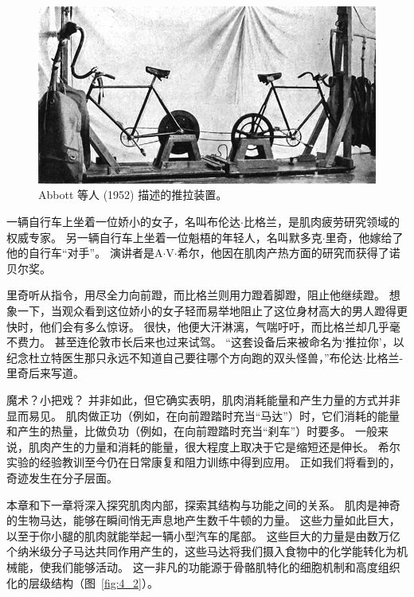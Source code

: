 \begin{figure}[!htb]
	\centering
	\includegraphics[width=1.0\linewidth]{chap4/4_1}
	\caption{Abbott 等人 (1952) 描述的推拉装置。 \label{fig:4_1}}
\end{figure}


一辆自行车上坐着一位娇小的女子，名叫布伦达$\cdot$比格兰，是肌肉疲劳研究领域的权威专家。
另一辆自行车上坐着一位魁梧的年轻人，名叫默多克$\cdot$里奇，他嫁给了他的自行车“对手”。
演讲者是A$\cdot$V$\cdot$希尔，他因在肌肉产热方面的研究而获得了诺贝尔奖。


里奇听从指令，用尽全力向前蹬，而比格兰则用力蹬着脚蹬，阻止他继续蹬。
想象一下，当观众看到这位娇小的女子轻而易举地阻止了这位身材高大的男人蹬得更快时，他们会有多么惊讶。
很快，他便大汗淋漓，气喘吁吁，而比格兰却几乎毫不费力。
甚至连伦敦市长后来也过来试驾。
“这套设备后来被命名为‘推拉你’，以纪念杜立特医生那只永远不知道自己要往哪个方向跑的双头怪兽，”布伦达$\cdot$比格兰-里奇后来写道。


魔术？小把戏？
并非如此，但它确实表明，肌肉消耗能量和产生力量的方式并非显而易见。
肌肉做正功（例如，在向前蹬踏时充当“马达”）时，它们消耗的能量和产生的热量，比做负功（例如，在向前蹬踏时充当“刹车”）时要多。
一般来说，肌肉产生的力量和消耗的能量，很大程度上取决于它是缩短还是伸长。
希尔实验的经验教训至今仍在日常康复和阻力训练中得到应用。
正如我们将看到的，奇迹发生在分子层面。


本章和下一章将深入探究肌肉内部，探索其结构与功能之间的关系。
肌肉是神奇的生物马达，能够在瞬间悄无声息地产生数千牛顿的力量。
这些力量如此巨大，以至于你小腿的肌肉就能举起一辆小型汽车的尾部。
这些巨大的力量是由数万亿个纳米级分子马达共同作用产生的，这些马达将我们摄入食物中的化学能转化为机械能，使我们能够活动。
这一非凡的功能源于骨骼肌特化的细胞机制和高度组织化的层级结构（图~\ref{fig:4_2}）。


